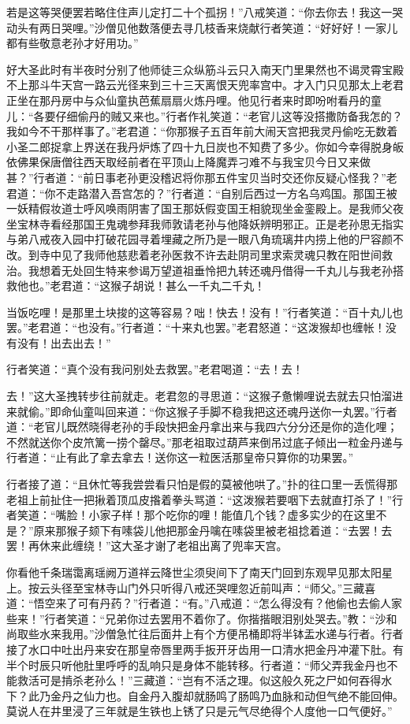 \documentclass[12pt,UTF8]{ctexbook}
\begin{document}
若是这等哭便罢若略住住声儿定打二十个孤拐！”八戒笑道：“你去你去！我这一哭动头有两日哭哩。”沙僧见他数落便去寻几枝香来烧献行者笑道：“好好好！一家儿都有些敬意老孙才好用功。”

好大圣此时有半夜时分别了他师徒三众纵筋斗云只入南天门里果然也不谒灵霄宝殿不上那斗牛天宫一路云光径来到三十三天离恨天兜率宫中。才入门只见那太上老君正坐在那丹房中与众仙童执芭蕉扇扇火炼丹哩。他见行者来时即吩咐看丹的童儿：“各要仔细偷丹的贼又来也。”行者作礼笑道：“老官儿这等没搭撒防备我怎的？我如今不干那样事了。”老君道：“你那猴子五百年前大闹天宫把我灵丹偷吃无数着小圣二郎捉拿上界送在我丹炉炼了四十九日炭也不知费了多少。你如今幸得脱身皈依佛果保唐僧往西天取经前者在平顶山上降魔弄刁难不与我宝贝今日又来做甚？”行者道：“前日事老孙更没稽迟将你那五件宝贝当时交还你反疑心怪我？”老君道：“你不走路潜入吾宫怎的？”行者道：“自别后西过一方名乌鸡国。那国王被一妖精假妆道士呼风唤雨阴害了国王那妖假变国王相貌现坐金銮殿上。是我师父夜坐宝林寺看经那国王鬼魂参拜我师敦请老孙与他降妖辨明邪正。正是老孙思无指实与弟八戒夜入园中打破花园寻着埋藏之所乃是一眼八角琉璃井内捞上他的尸容颜不改。到寺中见了我师他慈悲着老孙医救不许去赴阴司里求索灵魂只教在阳世间救治。我想着无处回生特来参谒万望道祖垂怜把九转还魂丹借得一千丸儿与我老孙搭救他也。”老君道：“这猴子胡说！甚么一千丸二千丸！

当饭吃哩！是那里土块捘的这等容易？咄！快去！没有！”行者笑道：“百十丸儿也罢。”老君道：“也没有。”行者道：“十来丸也罢。”老君怒道：“这泼猴却也缠帐！没有没有！出去出去！”

行者笑道：“真个没有我问别处去救罢。”老君喝道：“去！去！

去！”这大圣拽转步往前就走。老君忽的寻思道：“这猴子惫懒哩说去就去只怕溜进来就偷。”即命仙童叫回来道：“你这猴子手脚不稳我把这还魂丹送你一丸罢。”行者道：“老官儿既然晓得老孙的手段快把金丹拿出来与我四六分分还是你的造化哩；不然就送你个皮笊篱一捞个罄尽。”那老祖取过葫芦来倒吊过底子倾出一粒金丹递与行者道：“止有此了拿去拿去！送你这一粒医活那皇帝只算你的功果罢。”

行者接了道：“且休忙等我尝尝看只怕是假的莫被他哄了。”扑的往口里一丢慌得那老祖上前扯住一把揪着顶瓜皮揝着拳头骂道：“这泼猴若要咽下去就直打杀了！”行者笑道：“嘴脸！小家子样！那个吃你的哩！能值几个钱？虚多实少的在这里不是？”原来那猴子颏下有嗉袋儿他把那金丹噙在嗉袋里被老祖捻着道：“去罢！去罢！再休来此缠绕！”这大圣才谢了老祖出离了兜率天宫。

你看他千条瑞霭离瑶阙万道祥云降世尘须臾间下了南天门回到东观早见那太阳星上。按云头径至宝林寺山门外只听得八戒还哭哩忽近前叫声：“师父。”三藏喜道：“悟空来了可有丹药？”行者道：“有。”八戒道：“怎么得没有？他偷也去偷人家些来！”行者笑道：“兄弟你过去罢用不着你了。你揩揩眼泪别处哭去。”教：“沙和尚取些水来我用。”沙僧急忙往后面井上有个方便吊桶即将半钵盂水递与行者。行者接了水口中吐出丹来安在那皇帝唇里两手扳开牙齿用一口清水把金丹冲灌下肚。有半个时辰只听他肚里呼呼的乱响只是身体不能转移。行者道：“师父弄我金丹也不能救活可是掯杀老孙么！”三藏道：“岂有不活之理。似这般久死之尸如何吞得水下？此乃金丹之仙力也。自金丹入腹却就肠鸣了肠鸣乃血脉和动但气绝不能回伸。莫说人在井里浸了三年就是生铁也上锈了只是元气尽绝得个人度他一口气便好。”
\end{document}
